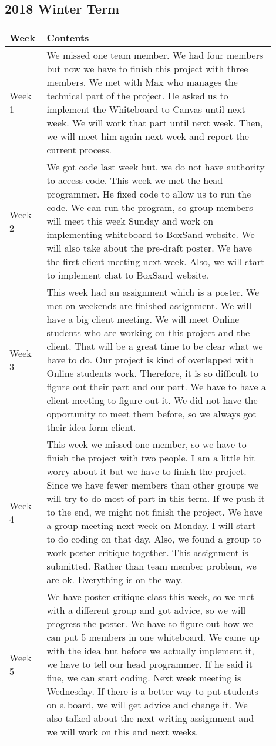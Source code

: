 \documentclass[10pt]{article}
\begin{document}
    \subsection{2018 Winter Term}
        \begin{center}
        \begin{tabular}{ | p{0.1\linewidth} | p{0.8\linewidth} | } \hline
            Week & Contents  \\ \hline  
            Week 1 & We missed one team member. We had four members but now we have to finish this project with three members. We met with Max who manages the technical part of the project. He asked us to implement the Whiteboard to  Canvas until next week. We will work that part until next week. Then, we will meet him again next week and report the current process.   \\ \hline
            Week 2 &  We got code last week but, we do not have authority to access code. This week we met the head programmer. He fixed code to allow us to run the code. We can run the program, so group members will meet this week Sunday and work on implementing whiteboard to BoxSand website. We will also take about the pre-draft poster. We have the first client meeting next week. Also, we will start to implement chat to BoxSand website. \\ \hline
            Week 3 & This week had an assignment which is a poster. We met on weekends are finished assignment. We will have a big client meeting. We will meet Online students who are working on this project and the client. That will be a great time to be clear what we have to do. Our project is kind of overlapped with  Online students work. Therefore, it is so difficult to figure out their part and our part. We have to have a client meeting to figure out it. We did not have the opportunity to meet them before, so we always got their idea form client.   \\ \hline
            Week 4 & This week we missed one member, so we have to finish the project with two people. I am a little bit worry about it but we have to finish the project. Since we have fewer members than other groups we will try to do most of part in this term. If we push it to the end, we might not finish the project. We have a  group meeting next week on Monday. I will start to do coding on that day. Also, we found a group to work poster critique together. This assignment is submitted. Rather than team member problem, we are ok. Everything is on the way.    \\ \hline 
            Week 5 &  We have poster critique class this week, so we met with a different group and got advice, so we will progress the poster. We have to figure out how we can put 5 members in one whiteboard. We came up with the idea but before we actually implement it, we have to tell our head programmer. If he said it fine, we can start coding. Next week meeting is Wednesday. If there is a better way to put students on a board, we will get advice and change it. We also talked about the next writing assignment and we will work on this and next weeks.   \\ \hline 

\end{tabular}
\end{center}
\end{document}
